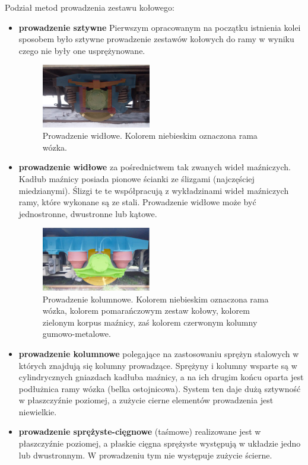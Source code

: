 Podział metod prowadzenia zestawu kołowego:
\begin{itemize}
\item \textbf{prowadzenie sztywne} 
Pierwszym opracowanym na początku istnienia kolei sposobem było sztywne prowadzenie zestawów kołowych do ramy w wyniku czego nie były one usprężynowane.
\begin{figure}
	\includegraphics[width=0.45\textwidth]{skryptkierownik-img/prowadzenie-zestawu-widlowe.jpg}
	\caption{Prowadzenie widłowe. Kolorem niebieskim oznaczona rama wózka.}
\end{figure}
\item \textbf{prowadzenie widłowe} za pośrednictwem tak zwanych wideł maźniczych. Kadłub maźnicy posiada pionowe ścianki ze ślizgami (najczęściej miedzianymi). Ślizgi te te współpracują z wykładzinami wideł maźniczych ramy, które wykonane są ze stali. Prowadzenie widłowe może być jednostronne, dwustronne lub kątowe. 
\begin{figure}
	\includegraphics[width=0.45\textwidth]{skryptkierownik-img/prowadzenie-zestawu-kolumnowe.jpg}
	\caption{Prowadzenie kolumnowe. Kolorem niebieskim oznaczona rama wózka, kolorem pomarańczowym zestaw kołowy, kolorem zielonym korpus maźnicy, zaś kolorem czerwonym kolumny gumowo-metalowe.}
\end{figure} 
\item \textbf{prowadzenie kolumnowe} polegające na zastosowaniu sprężyn stalowych w których znajdują się kolumny prowadzące. Sprężyny i kolumny wsparte są w cylindrycznych gniazdach kadłuba maźnicy, a na ich drugim końcu oparta jest podłużnica ramy wózka (belka ostojnicowa). System ten daje dużą sztywność w płaszczyźnie poziomej, a zużycie cierne elementów prowadzenia jest niewielkie. 
\item \textbf{prowadzenie sprężyste-cięgnowe} (taśmowe) realizowane jest w płaszczyźnie poziomej, a płaskie cięgna sprężyste występują w układzie jedno lub dwustronnym. W prowadzeniu tym nie występuje zużycie ścierne. 

\end{itemize}
